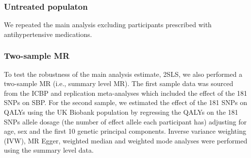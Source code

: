 \documentclass[11pt]{article}
\begin{document}
\subsubsection{Untreated populaton}
We repeated the main analysis excluding participants prescribed with antihypertensive medications. 
\color{violet}
\begin{stlog}\end{stlog}
\color{black}
\newpage
\subsubsection{Two-sample MR}

To test the robustness of the main analysis estimate, 2SLS, we also performed a two-sample MR (i.e., summary level MR)\cite{burgess2015mendelian}. The first sample data was sourced from the ICBP and replication meta-analyses which included the effect of the 181 SNPs on SBP\cite{evangelou2018genetic}. For the second sample, we estimated the effect of the 181 SNPs on QALYs using the UK Biobank population by regressing the QALYs on the 181 SNPs allele dosage (the number of effect allele each participant has) adjusting for age, sex and the first 10 genetic principal components\cite{sudlow2015uk, bycroft2018uk}. Inverse variance weighting (IVW), MR Egger, weighted median and weighted mode analyses were performed using the summary level data\cite{burgess2015mendelian}. 
\end{document}
